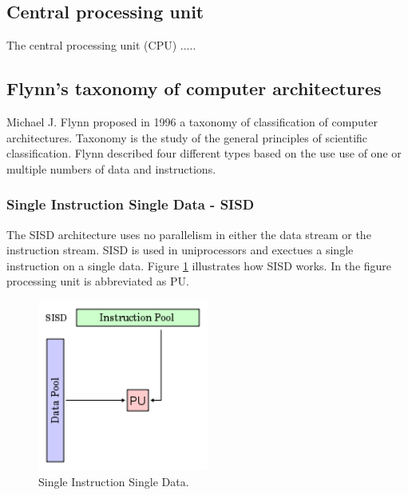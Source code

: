 \subsection{Central processing unit}
The central processing unit (CPU) .....

\subsection{Flynn's taxonomy of computer architectures}
Michael J. Flynn proposed in 1996 a taxonomy of classification of computer architectures. Taxonomy is the study of the general principles of scientific classification. Flynn described four different types based on the use use of one or multiple numbers of data and instructions.
 
\subsubsection*{Single Instruction Single Data - SISD}
The SISD architecture uses no parallelism in either the data stream or the instruction stream. SISD is used in uniprocessors and exectues a single instruction on a single data. Figure \ref{SISD} illustrates how SISD works. In the figure processing unit is abbreviated as PU.
\begin{figure}[h!]
\centering
\includegraphics[width=0.50\textwidth]{backgroundTheory/parallel/SISD}
\caption{Single Instruction Single Data.}
\label{SISD}
\end{figure}

